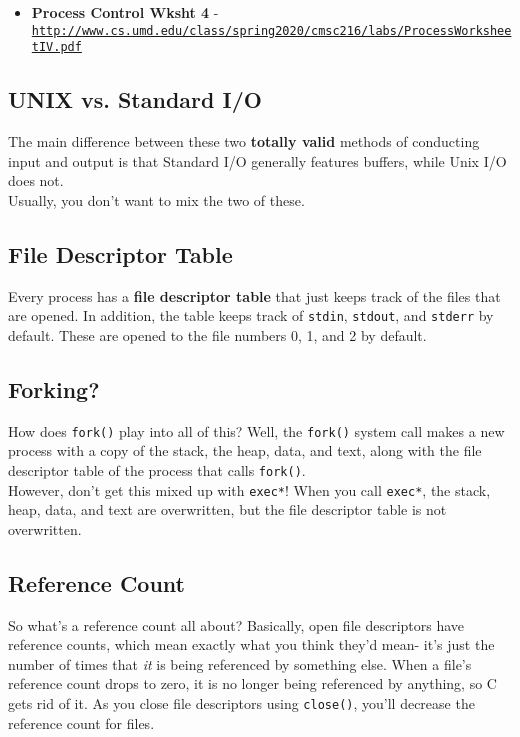 \documentclass[english, 10pt]{article}
\begin{document}
\begin{itemize}
	\item \textbf{Process Control Wksht 4} - \texttt{\href{http://www.cs.umd.edu/class/spring2020/cmsc216/labs/ProcessWorksheetIV.pdf}{http://www.cs.umd.edu/class/spring2020/cmsc216/labs/ProcessWorksheetIV.pdf}}
\end{itemize}
 
\subsection{UNIX vs. Standard I/O}

The main difference between these two \textbf{totally valid} methods of conducting input and output is that Standard I/O generally features buffers, while Unix I/O does not.\\

Usually, you don't want to mix the two of these.

\subsection{File Descriptor Table}

Every process has a \textbf{file descriptor table} that just keeps track of the files that are opened. In addition, the table keeps track of \texttt{stdin}, \texttt{stdout}, and \texttt{stderr} by default. These are opened to the file numbers 0, 1, and 2 by default.

\subsection{Forking?}

How does \texttt{fork()} play into all of this? Well, the \texttt{fork()} system call makes a new process with a copy of the stack, the heap, data, and text, along with the file descriptor table of the process that calls \texttt{fork()}.\\

However, don't get this mixed up with \texttt{exec*}! When you call \texttt{exec*}, the stack, heap, data, and text are overwritten, but the file descriptor table is not overwritten.

\subsection{Reference Count}

So what's a reference count all about? Basically, open file descriptors have reference counts, which mean exactly what you think they'd mean- it's just the number of times that \textit{it} is being referenced by something else. When a file's reference count drops to zero, it is no longer being referenced by anything, so C gets rid of it. As you close file descriptors using \texttt{close()}, you'll decrease the reference count for files.\\
\end{document}

